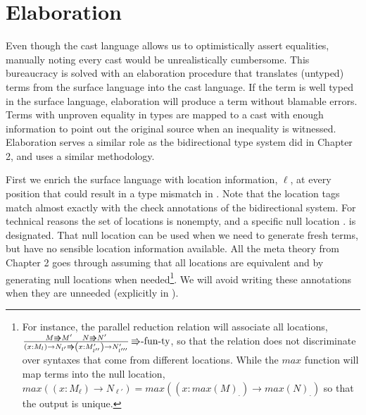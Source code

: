 \section{Elaboration}
 
Even though the cast language allows us to optimistically assert equalities, manually noting every cast would be unrealistically cumbersome.
This bureaucracy is solved with an elaboration procedure that translates (untyped) terms from the surface language into the cast language.
If the term is well typed in the surface language, elaboration will produce a term without blamable errors.
Terms with unproven equality in types are mapped to a cast with enough information to point out the original source when an inequality is witnessed.
Elaboration serves a similar role as the bidirectional type system did in Chapter 2, and uses a similar methodology.
 
First we enrich the surface language with location information, $\ell$, at every position that could result in a type mismatch in .
Note that the location tags match almost exactly with the check annotations of the bidirectional system.
For technical reasons the set of locations is nonempty, and a specific null location $.$ is designated.
That null location can be used when we need to generate fresh terms, but have no sensible location information available.
All the meta theory from Chapter 2 goes through assuming that all locations are equivalent and by generating null locations when needed\footnote{
 For instance, the parallel reduction relation will associate all locations,
 $\frac{M\Rrightarrow M'\quad N\Rrightarrow N'}{\left(x:M_{l}\right)\rightarrow N_{l'}\Rrightarrow\left(x:M'_{l''}\right)\rightarrow N'_{l'''}}\,\textrm{\ensuremath{\Rrightarrow}-fun-ty}$,
 so that the relation does not discriminate over syntaxes that come from different locations.
 While the $max$ function will map terms into the null location,
 $max\left(\left(x:M_{\ensuremath{\ell}}\right)\rightarrow N_{\ensuremath{\ell'}}\right)=max\left(\left(x:max\left(M\right)_{.}\right)\rightarrow max\left(N\right)_{.}\right)$
 so that the output is unique.}.
We will avoid writing these annotations when they are unneeded (explicitly in ).
 
